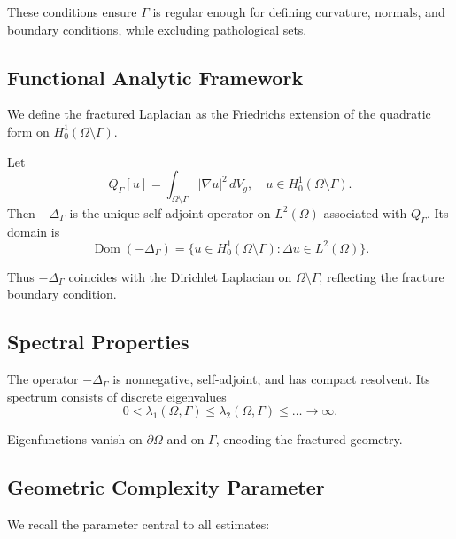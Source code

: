 These conditions ensure $\Gamma$ is regular enough for defining curvature,
normals, and boundary conditions, while excluding pathological sets.

\subsection{Functional Analytic Framework}

We define the fractured Laplacian as the Friedrichs extension of the quadratic
form on $H^1_0(\Omega\setminus\Gamma)$.

\begin{definition}
Let
\[
Q_\Gamma[u] = \int_{\Omega\setminus\Gamma} |\nabla u|^2 \, dV_g,
\quad u \in H^1_0(\Omega\setminus\Gamma).
\]
Then $-\Delta_\Gamma$ is the unique self-adjoint operator on $L^2(\Omega)$
associated with $Q_\Gamma$. Its domain is
\[
\operatorname{Dom}(-\Delta_\Gamma) =
\{u \in H^1_0(\Omega\setminus\Gamma) : \Delta u \in L^2(\Omega)\}.
\]
\end{definition}

Thus $-\Delta_\Gamma$ coincides with the Dirichlet Laplacian on
$\Omega\setminus\Gamma$, reflecting the fracture boundary condition.

\subsection{Spectral Properties}

\begin{proposition}
The operator $-\Delta_\Gamma$ is nonnegative, self-adjoint, and has compact
resolvent. Its spectrum consists of discrete eigenvalues
\[
0 < \lambda_1(\Omega,\Gamma) \leq \lambda_2(\Omega,\Gamma) \leq \dots \to \infty.
\]
\end{proposition}

Eigenfunctions vanish on $\partial\Omega$ and on $\Gamma$, encoding the
fractured geometry.

\subsection{Geometric Complexity Parameter}

We recall the parameter central to all estimates:


